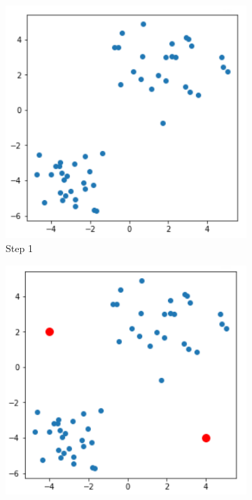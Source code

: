\documentclass[11pt]{article}
\begin{document}
\pagebreak

\begin{figure}[h]
	\centering
	\begin{subfigure}[b]{0.24\textwidth}
		\centering
		\includegraphics[width=\linewidth]{../imgs/knn-proc-1.png}
		\caption{Step 1}
	\end{subfigure}
	\begin{subfigure}[b]{0.24\textwidth}
		\centering
		\includegraphics[width=\linewidth]{../imgs/knn-proc-2.png}

\end{subfigure}
\end{figure}
\end{document}
